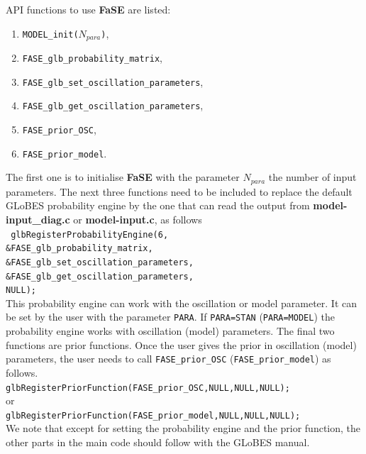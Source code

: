 \documentclass[aps,prd,nofootinbib,preprint]{revtex4}
\begin{document}
API functions to use \textbf{FaSE} are listed:
\begin{enumerate}
\item \texttt{MODEL\_init($N_{para}$)},
\item  \texttt{FASE\_glb\_probability\_matrix},
\item  \texttt{FASE\_glb\_set\_oscillation\_parameters},
\item  \texttt{FASE\_glb\_get\_oscillation\_parameters},
\item \texttt{FASE\_prior\_OSC},
\item \texttt{FASE\_prior\_model}.
\end{enumerate}
The first one is to initialise \textbf{FaSE} with the parameter $N_{para}$ the number of input parameters. The next three functions need to be included to replace the default GLoBES probability engine by the one that can read the output from  \textbf{model-input\_diag.c} or \textbf{model-input.c}, as follows\vspace{0.2cm}\\
\texttt{    glbRegisterProbabilityEngine(6,\\
                                 \&FASE\_glb\_probability\_matrix,\\
                                 \&FASE\_glb\_set\_oscillation\_parameters,\\
                                 \&FASE\_glb\_get\_oscillation\_parameters,\\
                                 NULL); }\vspace{0.2cm}\\ 
This probability engine can work with the oscillation or model parameter. It can be set by the user with the parameter \texttt{PARA}. If \texttt{PARA=STAN} (\texttt{PARA=MODEL}) the probability engine works with oscillation (model) parameters. The final two functions are prior functions. Once the user gives the prior in oscillation (model) parameters, the user needs to call \texttt{FASE\_prior\_OSC} (\texttt{FASE\_prior\_model}) as follows.\vspace{0.2cm}\\
\texttt{glbRegisterPriorFunction(FASE\_prior\_OSC,NULL,NULL,NULL); }  \\
or\\
\texttt{glbRegisterPriorFunction(FASE\_prior\_model,NULL,NULL,NULL); } \vspace{0.2cm}\\
We note that except for setting the probability engine and the prior function, the other parts in the main code should follow with the GLoBES manual. 
\end{document}
